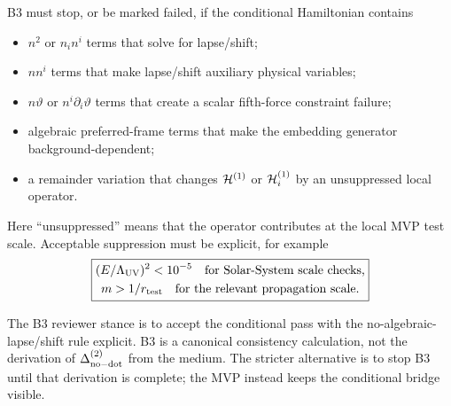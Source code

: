 \documentclass[11pt]{article}
\begin{document}
B3 must stop, or be marked failed, if the conditional Hamiltonian contains
\begin{itemize}
\item \(n^2\) or \(n_in^i\) terms that solve for lapse/shift;
\item \(nn^i\) terms that make lapse/shift auxiliary physical variables;
\item \(n\vartheta\) or \(n^i\partial_i\vartheta\) terms that create a scalar
  fifth-force constraint failure;
\item algebraic preferred-frame terms that make the embedding generator
  background-dependent;
\item a remainder variation that changes \({\cal H}^{(1)}\) or
  \({\cal H}_i^{(1)}\) by an unsuppressed local operator.
\end{itemize}
Here ``unsuppressed'' means that the operator contributes at the local MVP test
scale.  Acceptable suppression must be explicit, for example
\[
\boxed{
\begin{gathered}
(E/\Lambda_{\rm UV})^2<10^{-5}
\quad\text{for Solar-System scale checks,}\\
m>1/r_{\rm test}
\quad\text{for the relevant propagation scale.}
\end{gathered}
}
\]

The B3 reviewer stance is to accept the conditional pass with the
no-algebraic-lapse/shift rule explicit.  B3 is a canonical consistency
calculation, not the derivation of \(\Delta_{\rm no-dot}^{(2)}\) from the
medium.  The stricter alternative is to stop B3 until that derivation is
complete; the MVP instead keeps the conditional bridge visible.
\end{document}
